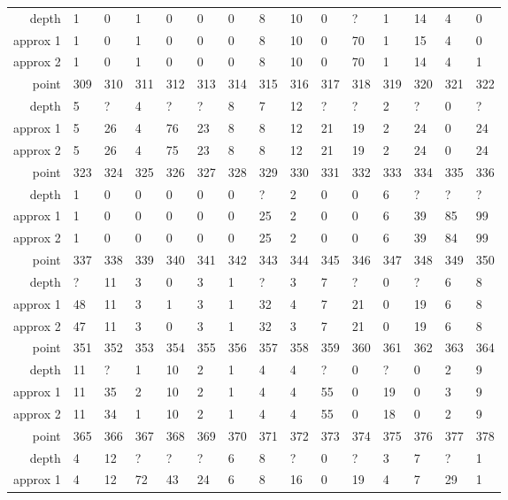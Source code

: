 \begin{center}
\begin{supertabular}{|r|l l l l l l l l l l l l l l|}
\hline
depth & 1 & 0 & 1 & 0 & 0 & 0 & 8 & 10 & 0 & ? & 1 & 14 & 4 & 0 \\
approx 1 & 1 & 0 & 1 & 0 & 0 & 0 & 8 & 10 & 0 & 70 & 1 & 15 & 4 & 0 \\
approx 2 & 1 & 0 & 1 & 0 & 0 & 0 & 8 & 10 & 0 & 70 & 1 & 14 & 4 & 1 \\
\hline
point & 309 & 310 & 311 & 312 & 313 & 314 & 315 & 316 & 317 & 318 & 319 & 320 & 321 & 322 \\
\hline
depth & 5 & ? & 4 & ? & ? & 8 & 7 & 12 & ? & ? & 2 & ? & 0 & ? \\
approx 1 & 5 & 26 & 4 & 76 & 23 & 8 & 8 & 12 & 21 & 19 & 2 & 24 & 0 & 24 \\
approx 2 & 5 & 26 & 4 & 75 & 23 & 8 & 8 & 12 & 21 & 19 & 2 & 24 & 0 & 24 \\
\hline
point & 323 & 324 & 325 & 326 & 327 & 328 & 329 & 330 & 331 & 332 & 333 & 334 & 335 & 336 \\
\hline
depth & 1 & 0 & 0 & 0 & 0 & 0 & ? & 2 & 0 & 0 & 6 & ? & ? & ? \\
approx 1 & 1 & 0 & 0 & 0 & 0 & 0 & 25 & 2 & 0 & 0 & 6 & 39 & 85 & 99 \\
approx 2 & 1 & 0 & 0 & 0 & 0 & 0 & 25 & 2 & 0 & 0 & 6 & 39 & 84 & 99 \\
\hline
point & 337 & 338 & 339 & 340 & 341 & 342 & 343 & 344 & 345 & 346 & 347 & 348 & 349 & 350 \\
\hline
depth & ? & 11 & 3 & 0 & 3 & 1 & ? & 3 & 7 & ? & 0 & ? & 6 & 8 \\
approx 1 & 48 & 11 & 3 & 1 & 3 & 1 & 32 & 4 & 7 & 21 & 0 & 19 & 6 & 8 \\
approx 2 & 47 & 11 & 3 & 0 & 3 & 1 & 32 & 3 & 7 & 21 & 0 & 19 & 6 & 8 \\
\hline
point & 351 & 352 & 353 & 354 & 355 & 356 & 357 & 358 & 359 & 360 & 361 & 362 & 363 & 364 \\
\hline
depth & 11 & ? & 1 & 10 & 2 & 1 & 4 & 4 & ? & 0 & ? & 0 & 2 & 9 \\
approx 1 & 11 & 35 & 2 & 10 & 2 & 1 & 4 & 4 & 55 & 0 & 19 & 0 & 3 & 9 \\
approx 2 & 11 & 34 & 1 & 10 & 2 & 1 & 4 & 4 & 55 & 0 & 18 & 0 & 2 & 9 \\
\hline
point & 365 & 366 & 367 & 368 & 369 & 370 & 371 & 372 & 373 & 374 & 375 & 376 & 377 & 378 \\
\hline
depth & 4 & 12 & ? & ? & ? & 6 & 8 & ? & 0 & ? & 3 & 7 & ? & 1 \\
approx 1 & 4 & 12 & 72 & 43 & 24 & 6 & 8 & 16 & 0 & 19 & 4 & 7 & 29 & 1 \\

\end{supertabular}
\end{center}
